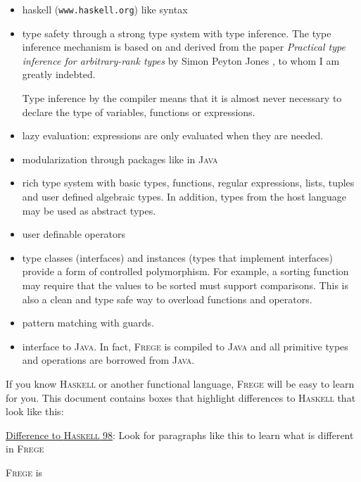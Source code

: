 \documentclass[a4paper,landscape,twocolumn]{report}
\newcommand{\boxquote}[3]{
\begin{center}
\colorbox{#1}%
{\parbox{0.45\textwidth}{
\sf
\underline{#2}:
#3
}}
\end{center}}
\newcommand{\hasdiff}[1]{\boxquote{rot}{Difference to \haskell{} 98}{#1}}
\newcommand{\haskell}[0]{\textsc{Haskell}}
\newcommand{\frege}[0]{\textsc{Frege}}
\newcommand{\java}[0]{\textsc{Java}}
\begin{document}
\begin{itemize}

\item haskell{} ({\tt www.haskell.org}) like syntax

\item type safety through a strong type system with type inference. The
type inference mechanism is based on and derived from the paper
\emph{Practical type inference for arbitrary-rank types} by Simon
Peyton Jones \cite{ptifart}, to whom I am greatly indebted.

Type inference by the compiler means that it is
almost never necessary to declare the type of variables, functions or
expressions.

\item lazy evaluation: expressions are only evaluated when they are
needed.

\item modularization through packages like in \java{}

\item rich type system with basic types, functions, regular expressions,
lists, tuples and user defined algebraic types.
In addition, types from the host language may be used as abstract
types.

\item user definable operators

\item type classes (interfaces) and instances (types that
implement interfaces) provide a form of controlled polymorphism. For
example, a sorting function may require that the values to be sorted
must support comparisons. This is also a clean and type safe way to
overload functions and operators.

\item pattern matching with guards.

\item interface to \java{}. In fact, \frege{} is
compiled to \java{} and
all primitive types and operations are borrowed from \java{}.


\end{itemize}

If you know \haskell{} or another functional language,
\frege{} will be easy to learn for you. This document contains boxes
that highlight differences to \haskell{} that look like this:

\hasdiff{Look for paragraphs like this to learn what is different in
\frege{}}

\frege{} is
\end{document}
